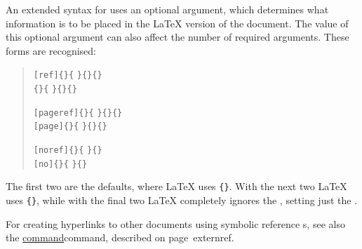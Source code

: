 \bigskip\htmlrule[50\% center]
\begin{changebar}%
\noindent
An extended syntax for  uses an optional argument, 
which determines what information is to be placed in the \LaTeX{} version
of the document. The value of this optional argument can also affect 
the number of required arguments. 
These forms are recognised:

\begin{small}
\begin{quote}\label{hypernoref}
\verb|[ref]{|\verb|}{|%
\verb|}{|\verb|}{|\verb|}|\\
\verb|{|\verb|}{|%
\verb|}{|\verb|}{|\verb|}|\medskip

\verb|[pageref]{|\verb|}{|%
\verb|}{|\verb|}{|\verb|}|\\
\verb|[page]{|\verb|}{|%
\verb|}{|\verb|}{|\verb|}|\medskip

\verb|[noref]{|\verb|}{|%
\verb|}{|\verb|}|\\
\verb|[no]{|\verb|}{|%
\verb|}{|\verb|}|
\end{quote}
\end{small}

\noindent
The first two are the defaults, where \LaTeX{} 
uses \verb|{|\verb|}|.
With the next two \LaTeX{} uses \verb|{|\verb|}|,
while with the final two \LaTeX{} completely ignores the ,
setting just the .
\end{changebar}

\medskip
{}%
\html{\\}\noindent
For creating hyperlinks to other documents
using symbolic reference s, 
see also the  
\hyperref[page]{command}{command, described on page~}{}{externref}.

